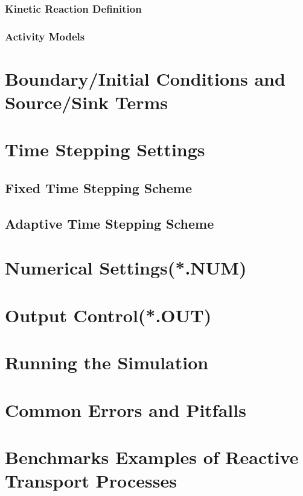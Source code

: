\subsubsection{Kinetic Reaction Definition}

\subsubsection{Activity Models}

\section{Boundary/Initial Conditions and Source/Sink Terms}

\section{Time Stepping Settings}

\subsection{Fixed Time Stepping Scheme}

\subsection{Adaptive Time Stepping Scheme}

\section{Numerical Settings(*.NUM)}

\section{Output Control(*.OUT)}

\section{Running the Simulation}

\section{Common Errors and Pitfalls}



\section{Benchmarks Examples of Reactive Transport Processes}

